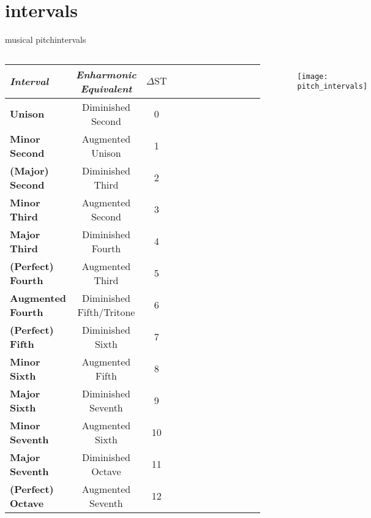     \section{intervals}
        \begin{frame}{musical pitch}{intervals}
            \vspace{-8mm}
            \begin{columns}
            \begin{scriptsize}
                \begin{table}
                    \centering
                    \begin{tabular}{lccccccccccc} %
                        \\ \hline
                        \bf{\emph{Interval}}	 & \bf{\emph{Enharmonic Equivalent}}	 & \bf{\emph{$\Delta\mathrm{ST}$}}\\ 
                         \hline
                        \bf{Unison}	 & Diminished Second	 & 0\\
                        \bf{Minor Second}	 & Augmented Unison	 & 1\\
                        \bf{(Major) Second}	 & Diminished Third	 & 2\\
                        \bf{Minor Third}	 & Augmented Second	 & 3\\
                        \bf{Major Third}	 & Diminished Fourth	 & 4\\
                        \bf{(Perfect) Fourth}	 & Augmented Third	 & 5\\
                        \bf{Augmented Fourth}	 & Diminished Fifth/Tritone	 & 6\\
                        \bf{(Perfect) Fifth}	 & Diminished Sixth	 & 7\\
                        \bf{Minor Sixth}	 & Augmented Fifth	 & 8\\
                        \bf{Major Sixth}	 & Diminished Seventh	 & 9\\
                        \bf{Minor Seventh}	 & Augmented Sixth	 & 10\\
                        \bf{Major Seventh}	 & Diminished Octave	 & 11\\
                        \bf{(Perfect) Octave}	 & Augmented Seventh	 & 12\\
                    \end{tabular}
                \end{table}
            \end{scriptsize}
            \begin{figure}
                \texttt{[image: pitch\_intervals]}
            \end{figure}
            \end{columns}
        \end{frame}


